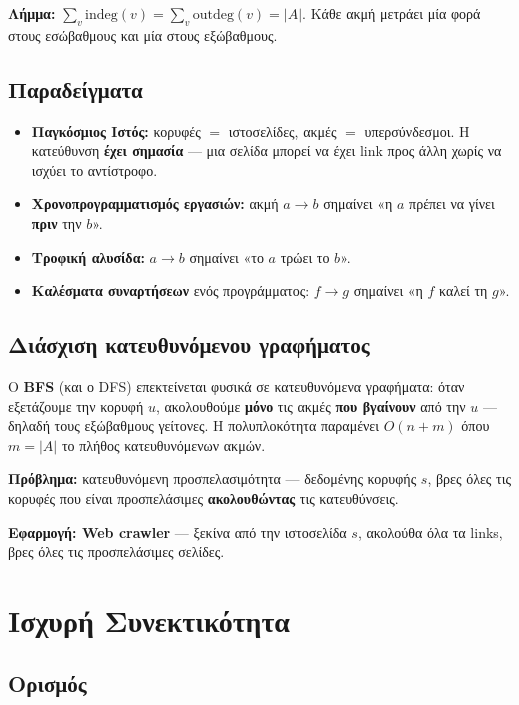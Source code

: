 \documentclass[11pt,a4paper]{article}
\begin{document}
\textbf{Λήμμα:} $\sum_v \text{indeg}(v) = \sum_v \text{outdeg}(v) = |A|$. Κάθε
ακμή μετράει μία φορά στους εσώβαθμους και μία στους εξώβαθμους.

\subsection{Παραδείγματα}

\begin{itemize}
  \item \textbf{Παγκόσμιος Ιστός:} κορυφές $=$ ιστοσελίδες, ακμές $=$
  υπερσύνδεσμοι. Η κατεύθυνση \textbf{έχει σημασία} --- μια σελίδα μπορεί να έχει
  link προς άλλη χωρίς να ισχύει το αντίστροφο.
  \item \textbf{Χρονοπρογραμματισμός εργασιών:} ακμή $a \to b$ σημαίνει «η $a$
  πρέπει να γίνει \textbf{πριν} την $b$».
  \item \textbf{Τροφική αλυσίδα:} $a \to b$ σημαίνει «το $a$ τρώει το $b$».
  \item \textbf{Καλέσματα συναρτήσεων} ενός προγράμματος: $f \to g$ σημαίνει «η
  $f$ καλεί τη $g$».
\end{itemize}

\subsection{Διάσχιση κατευθυνόμενου γραφήματος}

Ο \textbf{BFS} (και ο DFS) επεκτείνεται φυσικά σε κατευθυνόμενα γραφήματα: όταν
εξετάζουμε την κορυφή $u$, ακολουθούμε \textbf{μόνο} τις ακμές \textbf{που
βγαίνουν} από την $u$ --- δηλαδή τους εξώβαθμους γείτονες. Η πολυπλοκότητα
παραμένει $O(n + m)$ όπου $m = |A|$ το πλήθος κατευθυνόμενων ακμών.

\textbf{Πρόβλημα:} κατευθυνόμενη προσπελασιμότητα --- δεδομένης κορυφής $s$, βρες
όλες τις κορυφές που είναι προσπελάσιμες \textbf{ακολουθώντας} τις κατευθύνσεις.

\textbf{Εφαρμογή: Web crawler} --- ξεκίνα από την ιστοσελίδα $s$, ακολούθα όλα τα
links, βρες όλες τις προσπελάσιμες σελίδες.

\section{Ισχυρή Συνεκτικότητα}

\subsection{Ορισμός}
\end{document}

